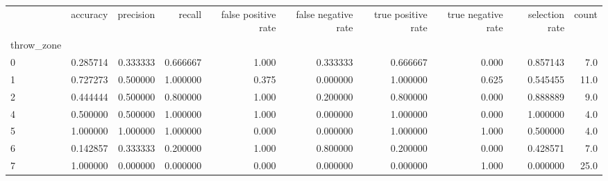 \begin{tabular}{lrrrrrrrrr}
\toprule
{} &  accuracy &  precision &    recall &  false positive rate &  false negative rate &  true positive rate &  true negative rate &  selection rate &  count \\
throw\_zone &           &            &           &                      &                      &                     &                     &                 &        \\
\midrule
0          &  0.285714 &   0.333333 &  0.666667 &                1.000 &             0.333333 &            0.666667 &               0.000 &        0.857143 &    7.0 \\
1          &  0.727273 &   0.500000 &  1.000000 &                0.375 &             0.000000 &            1.000000 &               0.625 &        0.545455 &   11.0 \\
2          &  0.444444 &   0.500000 &  0.800000 &                1.000 &             0.200000 &            0.800000 &               0.000 &        0.888889 &    9.0 \\
4          &  0.500000 &   0.500000 &  1.000000 &                1.000 &             0.000000 &            1.000000 &               0.000 &        1.000000 &    4.0 \\
5          &  1.000000 &   1.000000 &  1.000000 &                0.000 &             0.000000 &            1.000000 &               1.000 &        0.500000 &    4.0 \\
6          &  0.142857 &   0.333333 &  0.200000 &                1.000 &             0.800000 &            0.200000 &               0.000 &        0.428571 &    7.0 \\
7          &  1.000000 &   0.000000 &  0.000000 &                0.000 &             0.000000 &            0.000000 &               1.000 &        0.000000 &   25.0 \\
\bottomrule
\end{tabular}
